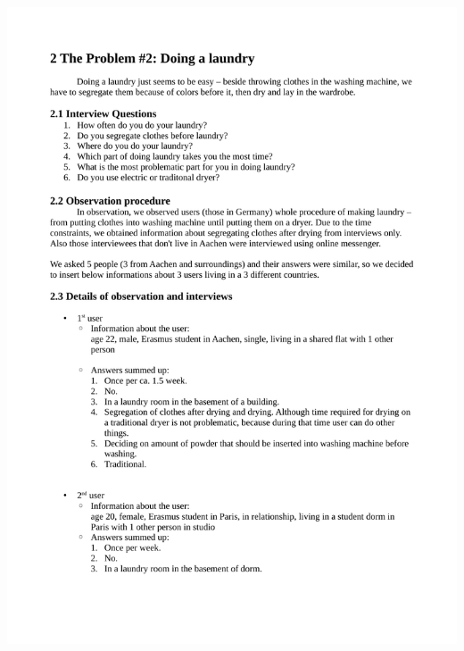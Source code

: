 \documentclass[a4paper,11pt,oneside]{scrreprt}
\begin{document}
%		
%		
%		
%	
\vspace{-2cm}
\includegraphics[page=1, trim={2cm 0cm 0cm 0cm}]{Laundry.pdf}
\end{document}
